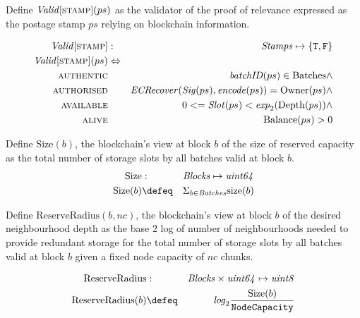 \begin{definition}
\label{def:postage-stamp-validity}
Define $\mathit{Valid}[\textsc{\lowercase{STAMP}}](ps)$ as the validator of the proof of relevance expressed as the postage stamp $ps$ relying on blockchain information.

\begin{eqnarray}
\mathit{Valid}[\textsc{\lowercase{STAMP}}] &:& \mathit{Stamps} \mapsto \{\mathtt{T,F}\}\\
\mathit{Valid}[\textsc{\lowercase{STAMP}}](ps) &\Leftrightarrow& \\
\textsc{authentic} & & \mathit{batchID}(ps)\in\mathrm{Batches}\wedge
\\
\textsc{authorised} & &  \mathit{ECRecover}(\mathit{Sig}(ps), \mathit{encode}(ps)) = \mathrm{Owner}(ps) \wedge
\\
\textsc{available} & & 0 <= \mathit{Slot}(ps) < \mathit{exp}_2({\mathrm{Depth}(ps)})\wedge
\\
\textsc{alive} & & \mathrm{Balance}(ps) > 0
\end{eqnarray}
\end{definition}


\begin{definition}
Define $\mathrm{Size}(b)$, the blockchain's view at block $b$ of the size of reserved capacity as the total number of storage slots by all batches valid at block $b$.
\begin{eqnarray}
\mathrm{Size}&:&\mathit{Blocks}\mapsto \mathit{uint64}\\
\mathrm{Size}(b)&\defeq&\Sigma_{b\in \mathit{Batches}}\mathrm{size}(b)
\end{eqnarray}
\end{definition}


\begin{definition}
Define $\mathrm{ReserveRadius}(b, nc)$, the blockchain's view at block $b$ of the desired neighbourhood depth as the base 2 log of number of neighbourhoods needed to provide redundant storage for the total number of storage slots by all batches valid at block $b$ given a fixed node capacity of $nc$ chunks.

\begin{eqnarray}
\mathrm{ReserveRadius}&:&\mathit{Blocks}\times\mathit{uint64}\mapsto \mathit{uint8}\\
\mathrm{ReserveRadius}(b)&\defeq&\mathit{log}_2\frac{\mathrm{Size}(b)}{\texttt{NodeCapacity}}
\end{eqnarray}
\end{definition}



